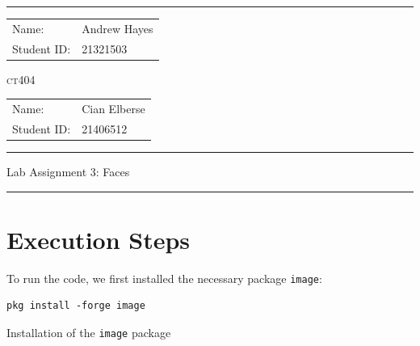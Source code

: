 \documentclass[a4paper]{article}
\newenvironment{code}{\captionsetup{type=listing}}{}
\begin{document}
\hrule \medskip
\begin{minipage}{0.295\textwidth} 
    \raggedright
    \footnotesize 
    \begin{tabular}{@{}l l} %
        Name: & Andrew Hayes \\
        Student ID: & 21321503 \\
    \end{tabular}
\end{minipage}
\begin{minipage}{0.4\textwidth} 
    \centering 
    \vspace{0.4em}
    \LARGE 
    \textsc{ct404} \\ 
\end{minipage}
\begin{minipage}{0.295\textwidth} 
    \raggedleft
    \footnotesize 
    \begin{tabular}{@{}l l} %
        Name: & Cian Elberse \\
        Student ID: & 21406512 \\
    \end{tabular}
\end{minipage}
\smallskip
\hrule 
\begin{center}
    \normalsize
    Lab Assignment 3: Faces
\end{center}
\hrule

%
%

\section{Execution Steps}
To run the code, we first installed the necessary package \texttt{image}:
\begin{code}
\begin{verbatim}
pkg install -forge image
\end{verbatim}
\caption{Installation of the \texttt{image} package}
\end{code}
\end{document}
